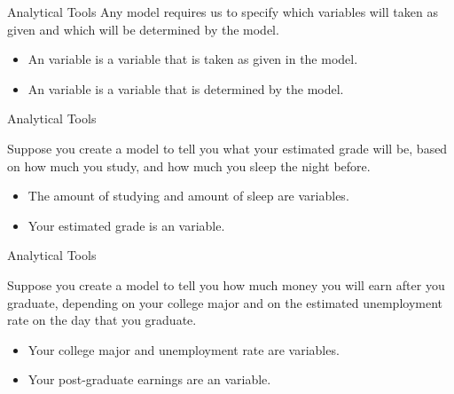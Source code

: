 \documentclass[12pt,t]{beamer}
\begin{document}
\begin{frame}{Analytical Tools}
  Any model requires us to specify which variables will taken as given and which will be determined by the model.
  \begin{itemize}
    \item An  variable is a variable that is taken as given in the model.
    \item An  variable is a variable that is determined by the model.
  \end{itemize}
\end{frame}

\begin{frame}{Analytical Tools}
  \bigskip
  
  Suppose you create a model to tell you what your estimated grade will be, based on how much you study, and how much you sleep the night before.
  \pause
  \begin{itemize}
    \item The amount of studying and amount of sleep are  variables.
    \item Your estimated grade is an  variable.
  \end{itemize}
\end{frame}

\begin{frame}{Analytical Tools}
  \bigskip
  
  Suppose you create a model to tell you how much money you will earn after you graduate, depending on your college major and on the estimated unemployment rate on the day that you graduate.
  \pause
  \begin{itemize}
    \item Your college major and unemployment rate are  variables.
    \item Your post-graduate earnings are an  variable.
  \end{itemize}
\end{frame}
\end{document}
